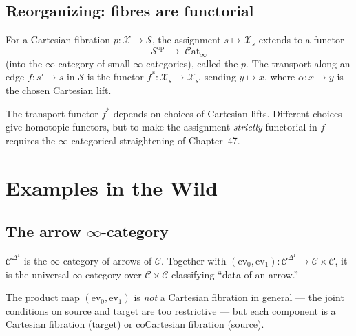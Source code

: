 \subsection{Reorganizing: fibres are functorial}

\begin{theorem}
\label{thm:fibres-functorial}
For a Cartesian fibration $p : \mathcal{X} \to \mathcal{S}$, the assignment
$s \mapsto \mathcal{X}_s$ extends to a functor
\begin{equation*}
  \mathcal{S}^{\mathrm{op}} \;\longrightarrow\; \mathcal{C}\mathrm{at}_\infty
\end{equation*}
(into the $\infty$-category of small $\infty$-categories), called the
 $p$. The transport along an edge $f : s' \to
s$ in $\mathcal{S}$ is the functor $f^* : \mathcal{X}_s \to \mathcal{X}_{s'}$
sending $y \mapsto x$, where $\alpha : x \to y$ is the chosen Cartesian
lift.
\end{theorem}

\begin{remark}
The transport functor $f^*$ depends on choices of Cartesian lifts.
Different choices give homotopic functors, but to make the assignment
\emph{strictly} functorial in $f$ requires the $\infty$-categorical
straightening of Chapter~47.
\end{remark}


\section{Examples in the Wild}
\label{sec:fibration-examples}

\subsection{The arrow $\infty$-category}

\begin{example_thm}
\label{ex:arrow-infty-cat}
$\mathcal{C}^{\Delta^1}$ is the $\infty$-category of arrows of
$\mathcal{C}$. Together with $(\mathrm{ev}_0, \mathrm{ev}_1) :
\mathcal{C}^{\Delta^1} \to \mathcal{C} \times \mathcal{C}$, it is the
universal $\infty$-category over $\mathcal{C} \times \mathcal{C}$
classifying ``data of an arrow.''

The product map $(\mathrm{ev}_0, \mathrm{ev}_1)$ is \emph{not} a
Cartesian fibration in general — the joint conditions on source and
target are too restrictive — but each component is a Cartesian
fibration (target) or coCartesian fibration (source).
\end{example_thm}

